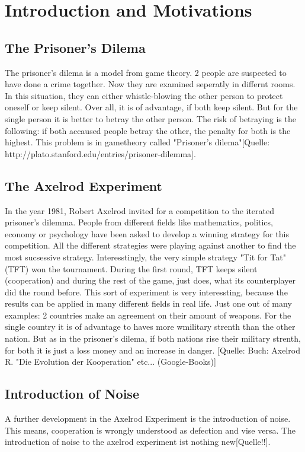 \documentclass[11pt,twoside]{article}
\begin{document}
\section{Introduction and Motivations}
\subsection{The Prisoner's Dilema}
The prisoner's dilema is a model from game theory. 2 people are suspected to have done a crime together. Now they are examined seperatly in differnt rooms. In this situation, they can either whistle-blowing the other person to protect oneself or keep silent. Over all, it is of advantage, if both keep silent. But for the single person it is better to betray the other person. The risk of betraying is the following: if both accaused people betray the other, the penalty for both is the highest. This problem is in gametheory called "Prisoner's dilema"[Quelle: http://plato.stanford.edu/entries/prisoner-dilemma].

\subsection{The Axelrod Experiment}
In the year 1981, Robert Axelrod invited for a competition to the iterated prisoner's dilemma. People from different fields like mathematics, politics, economy or psychology have been asked to develop a winning strategy for this competition. All the different strategies were playing against another to find the most sucsessive strategy. Interesstingly, the very simple strategy "Tit for Tat" (TFT) won the tournament. During the first round, TFT keeps silent (cooperation) and during the rest of the game, just does, what its counterplayer did the round before.
This sort of experiment is very interessting, because the results can be applied in many different fields in real life. Just one out of many examples: 2 countries make an agreement on their amount of weapons. For the single country it is of advantage to haves more wmilitary strenth than the other nation. But as in the prisoner's dilema, if both nations rise their military strenth, for both it is just a loss money and an increase in danger.
[Quelle: Buch: Axelrod R. "Die Evolution der Kooperation" etc... (Google-Books)]

\subsection{Introduction of Noise}
A further development in the Axelrod Experiment is the introduction of noise. This means, cooperation is wrongly understood as defection and vise versa. The introduction of noise to the axelrod experiment ist nothing new[Quelle!!]. 
\end{document}

